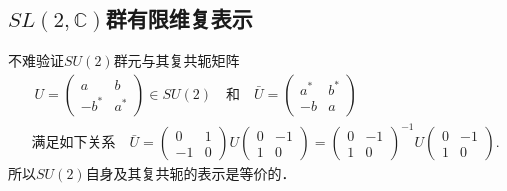 \subsection{$SL(2,\mathbb{C})$群有限维复表示}\label{chlar:sec_sl2rep}


不难验证$SU(2)$群元与其复共轭矩阵
\begin{align*}
    &\ U=\begin{pmatrix} a & b \\ -b^* & a^* \end{pmatrix} \in SU(2)
    \quad \text{和}\quad  \bar{U}=
    \begin{pmatrix} a^* & b^* \\ -b & a \end{pmatrix}  \\
&\text{满足如下关系}\quad
    \bar{U}=\begin{pmatrix} 0 & 1 \\ -1 & 0 \end{pmatrix} U
    \begin{pmatrix} 0 & -1 \\ 1 & 0 \end{pmatrix}
    =\begin{pmatrix} 0 & -1 \\ 1 & 0 \end{pmatrix}^{-1} U    
    \begin{pmatrix} 0 & -1 \\ 1 & 0 \end{pmatrix} .
\end{align*}
所以$SU(2)$自身及其复共轭的表示是等价的．

